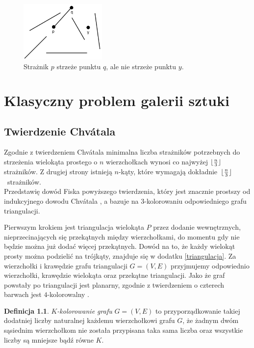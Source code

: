 \documentclass{xmgr}
\DeclarePairedDelimiter\floor{\lfloor}{\rfloor}
\theoremstyle{definition}
\newtheorem{Definicja}{Definicja}
\begin{document}
\begin{figure}[ht!]
  \centering
  \includegraphics[height=3cm]{rysunki/straznik_na_plaszczyznie.png}
    \caption{Strażnik $p$ strzeże punktu $q$, ale nie strzeże punktu $y$.}
\end{figure} 

\chapter{Klasyczny problem galerii sztuki}

\section{Twierdzenie Chv\'atala}\label{sec:klasyczny}
Zgodnie z twierdzeniem Chv\'atala \cite{chvatal} \label{tw chvatala} minimalna liczba strażników potrzebnych do strzeżenia wielokąta prostego o $n$ wierzchołkach wynosi co najwyżej $\floor{\frac{n}{3}}$ strażników.
Z drugiej strony istnieją $n$-kąty, które wymagają \mbox{dokładnie $\floor{\frac{n}{3}}$ strażników.}
\\\indent Przedstawię dowód Fiska \cite{fisk} powyższego twierdzenia, który jest znacznie prostszy od indukcyjnego dowodu Chv\'atala \cite{chvatal}, a bazuje na $3$-kolorowaniu odpowiedniego grafu triangulacji. 

Pierwszym krokiem jest triangulacja wielokąta $P$ przez dodanie wewnętrznych, nieprzecinających się przekątnych między wierzchołkami, do momentu gdy nie będzie można już dodać więcej przekątnych. 
Dowód na to, że każdy wielokąt prosty można podzielić na trójkąty, znajduje się w dodatku \ref{triangulacja}.
Za wierzchołki i krawędzie grafu triangulacji $G=(V,E)$ przyjmujemy odpowiednio wierzchołki, krawędzie wielokąta oraz przekątne triangulacji. Jako że graf powstały po triangulacji jest planarny, zgodnie z twierdzeniem o czterech barwach jest $4$-kolorowalny \cite{appel}.

\begin{Definicja} 
   \emph{$K$-kolorowanie grafu} $G = (V,E)$ to przyporządkowanie takiej dodatniej liczby naturalnej każdemu wierzchołkowi grafu $G$, że żadnym dwóm sąsiednim wierzchołkom nie została przypisana taka sama liczba oraz wszystkie liczby są mniejsze bądź równe $K$.
\end{Definicja}
\end{document}
